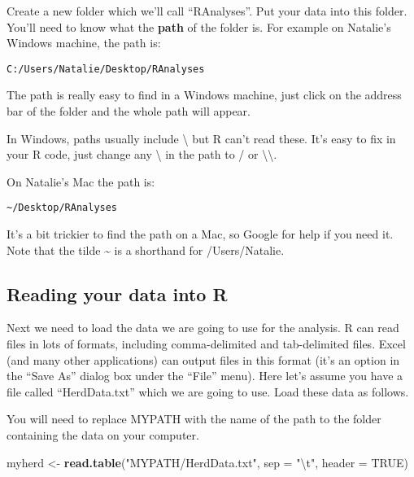 \documentclass[12pt]{article}
\newcommand{\KeywordTok}[1]{\textcolor[rgb]{0.13,0.29,0.53}{\textbf{{#1}}}}
\newcommand{\DataTypeTok}[1]{\textcolor[rgb]{0.13,0.29,0.53}{{#1}}}
\newcommand{\CharTok}[1]{\textcolor[rgb]{0.31,0.60,0.02}{{#1}}}
\newcommand{\StringTok}[1]{\textcolor[rgb]{0.31,0.60,0.02}{{#1}}}
\newcommand{\OtherTok}[1]{\textcolor[rgb]{0.56,0.35,0.01}{{#1}}}
\newcommand{\NormalTok}[1]{{#1}}
\begin{document}
Create a new folder which we'll call
``RAnalyses''. Put your data into this folder. 
You'll need to know what the \textbf{path} of the folder is. 
For example on Natalie's Windows machine, the path is:

\begin{snugshade}
\texttt{C:/Users/Natalie/Desktop/RAnalyses}
\end{snugshade}

The path is really easy to find in a Windows machine, just click on the
address bar of the folder and the whole path will appear.

\begin{framed}
In Windows, paths usually include \textbackslash{} but R
can't read these. It's easy to fix in your R code, just change any \textbackslash{} in
the path to / or \textbackslash{}\textbackslash{}.
\end{framed}

On Natalie's Mac the path is:

\begin{snugshade}
\texttt{\textasciitilde{}/Desktop/RAnalyses}
\end{snugshade}

It's a bit trickier to find the path on a Mac, so Google for help if you need it. 
Note that the tilde \textasciitilde{} is a shorthand for /Users/Natalie. 

\subsection{Reading your data into R}

Next we need to load the data we are going to use for the analysis. R
can read files in lots of formats, including comma-delimited and
tab-delimited files. Excel (and many other applications) can output
files in this format (it's an option in the ``Save As'' dialog box
under the ``File'' menu). Here let's assume you have a file called ``HerdData.txt''
which we are going to use. Load these data as follows. 

\begin{framed}
You will need to replace MYPATH with the name of the path to the folder 
containing the data on your computer.
\end{framed}

\begin{snugshade}
\begin{Highlighting}[]
\NormalTok{myherd <-}\StringTok{ }\KeywordTok{read.table}\NormalTok{(}\StringTok{"MYPATH/HerdData.txt"}\NormalTok{, }\DataTypeTok{sep =} \StringTok{"}\CharTok{\textbackslash{}t}\StringTok{"}\NormalTok{, }
                          \DataTypeTok{header =} \OtherTok{TRUE}\NormalTok{)}
\end{Highlighting}
\end{snugshade}
\end{document}
